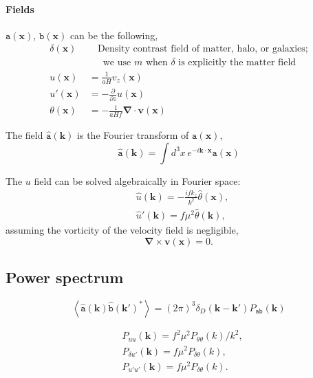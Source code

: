 \documentclass[a4paper,11pt, fleqn]{article}
\begin{document}
\paragraph{Fields}
$\mathtt{a}(\bm{x})$, $\mathtt{b}(\bm{x})$ can be the following,
%
\begin{align}
  \delta(\bm{x}) &\phantom{=\,} \mbox{Density contrast field of matter, halo, or galaxies;}\\
            &\phantom{=\,} \mbox{we use $m$ when $\delta$ is explicitly the matter field}\\
  u(\bm{x}) &= \frac{1}{aH} v_z(\bm{x})\\
  u'(\bm{x}) &= -\frac{\partial}{\partial z} u(\bm{x})\\
  \theta(\bm{x}) &= - \frac{1}{aHf} \bm{\nabla}\cdot \bm{v}(\bm{x})
\end{align}

\vspace{5mm}
The field $\hat{\texttt{a}}(\bm{k})$ is
the Fourier transform of $\texttt{a}(\bm{x})$, 
\begin{equation}
  \hat{\texttt{a}}(\bm{k}) =
  \int\! d^3 x \, e^{-i\bm{k}\cdot\bm{x}} \texttt{a}(\bm{x})
\end{equation}

The $u$ field can be solved algebraically in Fourier space:
%
\begin{align}
  &\hat{u}(\bm{k}) = -\frac{ifk_z}{k^2} \hat{\theta}(\bm{x}),\\
  &\hat{u}'(\bm{k}) = f\mu^2 \hat{\theta}(\bm{k}),
\end{align}
%
assuming the vorticity of the velocity field is negligible,
%
\begin{equation}
  \bm{\nabla} \times \bm{v}(\bm{x}) = 0.
\end{equation}

\clearpage
\subsection{Power spectrum}
\begin{equation}
  \left\langle \hat{\mathtt{a}}(\bm{k}) \hat{\mathtt{b}}(\bm{k}')^* \right\rangle
  = (2\pi)^3 \delta_D(\bm{k}-\bm{k}') P_{\mathtt{ab}}(\bm{k})
\end{equation}

\begin{align}
  &P_{uu}(\bm{k}) = f^2\mu^2 P_{\theta\theta}(k)/k^2,\\
  &P_{\delta u'}(\bm{k}) = f \mu^2 P_{\delta \theta}(k),\\
  &P_{u' u'}(\bm{k}) = f \mu^2 P_{\delta \theta}(k).\\
\end{align}
\end{document}
